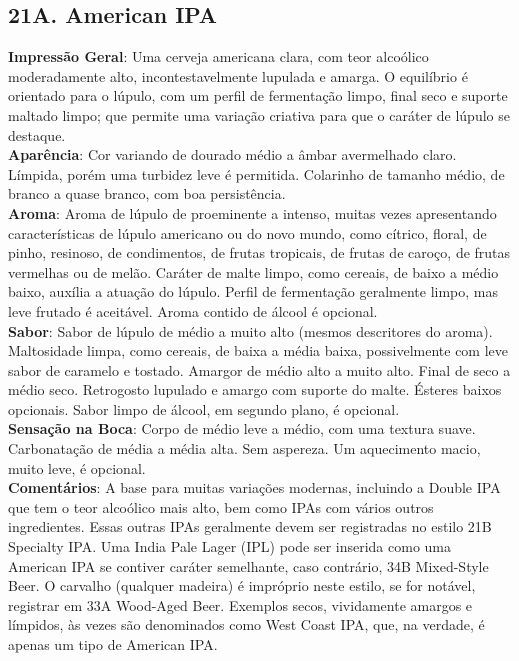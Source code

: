 \subsection*{21A. American IPA}
\textbf{Impressão Geral}: Uma cerveja americana clara, com teor alcoólico moderadamente alto, incontestavelmente lupulada e amarga. O equilíbrio é orientado para o lúpulo, com um perfil de fermentação limpo, final seco e suporte maltado limpo; que permite uma variação criativa para que o caráter de lúpulo se destaque. \\
\textbf{Aparência}: Cor variando de dourado médio a âmbar avermelhado claro. Límpida, porém uma turbidez leve é permitida. Colarinho de tamanho médio, de branco a quase branco, com boa persistência. \\
\textbf{Aroma}: Aroma de lúpulo de proeminente a intenso, muitas vezes apresentando características de lúpulo americano ou do novo mundo, como cítrico, floral, de pinho, resinoso, de condimentos, de frutas tropicais, de frutas de caroço, de frutas vermelhas ou de melão. Caráter de malte limpo, como cereais, de baixo a médio baixo, auxília a atuação do lúpulo. Perfil de fermentação geralmente limpo, mas leve frutado é aceitável. Aroma contido de álcool é opcional. \\
\textbf{Sabor}: Sabor de lúpulo de médio a muito alto (mesmos descritores do aroma). Maltosidade limpa, como cereais, de baixa a média baixa, possivelmente com leve sabor de caramelo e tostado. Amargor de médio alto a muito alto. Final de seco a médio seco. Retrogosto lupulado e amargo com suporte do malte. Ésteres baixos opcionais. Sabor limpo de álcool, em segundo plano, é opcional. \\
\textbf{Sensação na Boca}: Corpo de médio leve a médio, com uma textura suave. Carbonatação de média a média alta. Sem aspereza. Um aquecimento macio, muito leve, é opcional. \\
\textbf{Comentários}: A base para muitas variações modernas, incluindo a Double IPA que tem o teor alcoólico mais alto, bem como IPAs com vários outros ingredientes. Essas outras IPAs geralmente devem ser registradas no estilo 21B Specialty IPA. Uma India Pale Lager (IPL) pode ser inserida como uma American IPA se contiver caráter semelhante, caso contrário, 34B Mixed-Style Beer. O carvalho (qualquer madeira) é impróprio neste estilo, se for notável, registrar em 33A Wood-Aged Beer. Exemplos secos, vividamente amargos e límpidos, às vezes são denominados como West Coast IPA, que, na verdade, é apenas um tipo de American IPA. \\
